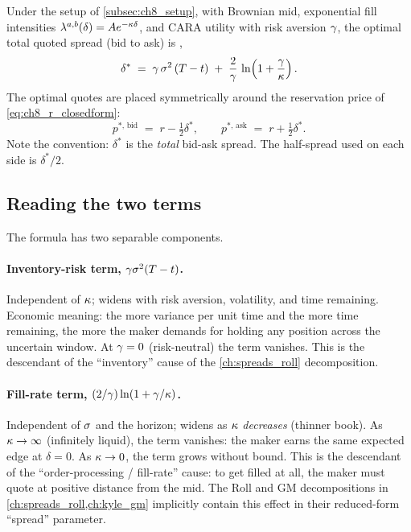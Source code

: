 \begin{keyfactbox}
Under the setup of \cref{subsec:ch8_setup}, with
Brownian mid, exponential fill intensities
$\lambda^{a,b}(\delta) = A e^{-\kappa \delta}$, and CARA utility
with risk aversion $\gamma$, the optimal total quoted spread
(bid to ask) is , 
\[
  \delta^{*} \;=\; \gamma\,\sigma^2\,(T - t)
             \;+\; \frac{2}{\gamma}\,
               \ln\!\left(1 + \frac{\gamma}{\kappa}\right).
\]
The optimal quotes are placed symmetrically around the
reservation price of \eqref{eq:ch8_r_closedform}:
\[
  p^{*,\,\mathrm{bid}} \;=\; r - \tfrac{1}{2}\delta^{*},
  \qquad
  p^{*,\,\mathrm{ask}} \;=\; r + \tfrac{1}{2}\delta^{*}.
\]
Note the convention: $\delta^*$ is the \emph{total} bid-ask
spread. The half-spread used on each side is $\delta^*/2$.
\end{keyfactbox}

\subsection{Reading the two terms}
\label{subsec:ch8_delta_terms}

The formula has two separable components.

\paragraph{Inventory-risk term, $\gamma \sigma^2 (T - t)$.}
Independent of $\kappa$; widens with risk aversion, volatility, and
time remaining. Economic meaning: the more variance per unit time
and the more time remaining, the more the maker demands for holding
any position across the uncertain window. At $\gamma = 0$
(risk-neutral) the term vanishes. This is the descendant of the
``inventory'' cause of the \cref{ch:spreads_roll} decomposition.

\paragraph{Fill-rate term, $(2/\gamma)\ln(1 + \gamma/\kappa)$.}
Independent of $\sigma$ and the horizon; widens as $\kappa$
\emph{decreases} (thinner book). As $\kappa \to \infty$ (infinitely
liquid), the term vanishes: the maker earns the same expected
edge at $\delta = 0$. As $\kappa \to 0$, the term grows without
bound. This is the descendant of the ``order-processing / fill-rate''
cause: to get filled at all, the maker must quote at positive
distance from the mid. The Roll and GM decompositions in
\cref{ch:spreads_roll,ch:kyle_gm} implicitly contain this effect in
their reduced-form ``spread'' parameter.

